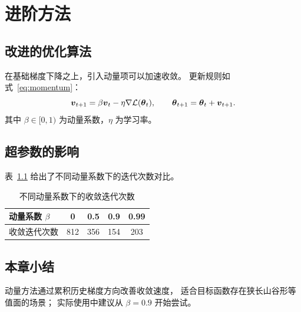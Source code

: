 \chapter{进阶方法}

\section{改进的优化算法}
在基础梯度下降之上，引入动量项可以加速收敛。
更新规则如式~\eqref{eq:momentum}：
\begin{equation}
  \boldsymbol{v}_{t+1} = \beta \boldsymbol{v}_t - \eta \nabla \mathcal{L}(\boldsymbol{\theta}_t),
  \qquad
  \boldsymbol{\theta}_{t+1} = \boldsymbol{\theta}_t + \boldsymbol{v}_{t+1}.
  \label{eq:momentum}
\end{equation}
其中 $\beta \in [0, 1)$ 为动量系数，$\eta$ 为学习率。

\section{超参数的影响}
表~\ref{tab:hyper} 给出了不同动量系数下的迭代次数对比。

\begin{table}[!htbp]
  \centering
  \caption{不同动量系数下的收敛迭代次数}
  \label{tab:hyper}
  \begin{tabular}{lcccc}
    \toprule
    动量系数 $\beta$ & 0 & 0.5 & 0.9 & 0.99 \\
    \midrule
    收敛迭代次数 & 812 & 356 & 154 & 203 \\
    \bottomrule
  \end{tabular}
\end{table}

\section{本章小结}
动量方法通过累积历史梯度方向改善收敛速度，
适合目标函数存在狭长山谷形等值面的场景；
实际使用中建议从 $\beta = 0.9$ 开始尝试。
